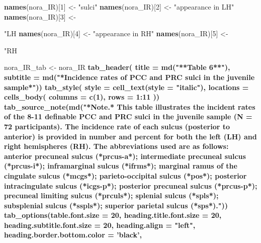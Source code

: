 \documentclass[
]{article}
\newenvironment{Shaded}{\begin{snugshade}}{\end{snugshade}}
\newcommand{\DataTypeTok}[1]{\textcolor[rgb]{0.13,0.29,0.53}{#1}}
\newcommand{\DecValTok}[1]{\textcolor[rgb]{0.00,0.00,0.81}{#1}}
\newcommand{\KeywordTok}[1]{\textcolor[rgb]{0.13,0.29,0.53}{\textbf{#1}}}
\newcommand{\NormalTok}[1]{#1}
\newcommand{\OperatorTok}[1]{\textcolor[rgb]{0.81,0.36,0.00}{\textbf{#1}}}
\newcommand{\StringTok}[1]{\textcolor[rgb]{0.31,0.60,0.02}{#1}}
\begin{document}
\begin{Shaded}
\begin{Highlighting}[]
{{\KeywordTok{names}\NormalTok{(nora_IR)[}\DecValTok{1}\NormalTok{] <-}\StringTok{ "sulci"}
\KeywordTok{names}\NormalTok{(nora_IR)[}\DecValTok{2}\NormalTok{] <-}\StringTok{ "appearance in LH"}
\KeywordTok{names}\NormalTok{(nora_IR)[}\DecValTok{3}\NormalTok{] <-}\StringTok{ "LH %"}
\KeywordTok{names}\NormalTok{(nora_IR)[}\DecValTok{4}\NormalTok{] <-}\StringTok{ "appearance in RH"}
\KeywordTok{names}\NormalTok{(nora_IR)[}\DecValTok{5}\NormalTok{] <-}\StringTok{ "RH %"}


\NormalTok{nora_IR_tab <-}\StringTok{ }\NormalTok{nora_IR }\OperatorTok{%>%}\StringTok{ }\KeywordTok{gt}\NormalTok{() }\OperatorTok{%>%}
\KeywordTok{tab_header}\NormalTok{(}
  \DataTypeTok{title =} \KeywordTok{md}\NormalTok{(}\StringTok{"**Table 6**"}\NormalTok{),}
  \DataTypeTok{subtitle =} \KeywordTok{md}\NormalTok{(}\StringTok{"*Incidence rates of PCC and PRC sulci in the juvenile sample*"}\NormalTok{)) }\OperatorTok{%>%}
\KeywordTok{tab_style}\NormalTok{(}
    \DataTypeTok{style =} \KeywordTok{cell_text}\NormalTok{(}\DataTypeTok{style =} \StringTok{"italic"}\NormalTok{),}
    \DataTypeTok{locations =} \KeywordTok{cells_body}\NormalTok{(}
      \DataTypeTok{columns =} \KeywordTok{c}\NormalTok{(}\DecValTok{1}\NormalTok{),}
      \DataTypeTok{rows =} \DecValTok{1}\OperatorTok{:}\DecValTok{11}
\NormalTok{    )) }\OperatorTok{%>%}
\KeywordTok{tab_source_note}\NormalTok{(}\KeywordTok{md}\NormalTok{(}\StringTok{"*Note.* This table illustrates the incident rates of the 8-11 definable PCC and PRC sulci in the juvenile sample (N = 72 participants). The incidence rate of each sulcus (posterior to anterior) is provided in number and percent for both the left (LH) and right hemispheres (RH). The abbreviations used are as follows: anterior precuneal sulcus (*prcus-a*); intermediate precuneal sulcus (*prcus-i*); inframarginal sulcus (*ifrms*); marginal ramus of the cingulate sulcus (*mcgs*); parieto-occipital sulcus (*pos*); posterior intracingulate sulcus (*icgs-p*); posterior precuneal sulcus (*prcus-p*); precuneal limiting sulcus (*prculs*); splenial sulcus (*spls*); subsplenial sulcus (*sspls*); superior parietal sulcus (*sps*)."}\NormalTok{)) }\OperatorTok{%>%}
\StringTok{  }\KeywordTok{tab_options}\NormalTok{(}\DataTypeTok{table.font.size =} \DecValTok{20}\NormalTok{,}
    \DataTypeTok{heading.title.font.size =} \DecValTok{20}\NormalTok{,}
    \DataTypeTok{heading.subtitle.font.size =} \DecValTok{20}\NormalTok{,}
    \DataTypeTok{heading.align =} \StringTok{"left"}\NormalTok{,}
    \DataTypeTok{heading.border.bottom.color =} \StringTok{'black'}\NormalTok{,}
}}}}}}}}
\end{Highlighting}
\end{Shaded}
\end{document}
